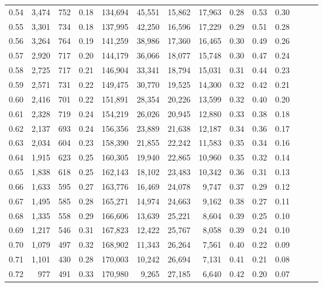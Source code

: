 \begin{tabular}{rrrrrrrrrrrrrr}
0.54 &  3,474 &  752 &  0.18 &  134,694 &   45,551 &  15,862 &  17,963 &  0.28 &  0.53 &      0.30 \\
0.55 &  3,301 &  734 &  0.18 &  137,995 &   42,250 &  16,596 &  17,229 &  0.29 &  0.51 &      0.28 \\
0.56 &  3,264 &  764 &  0.19 &  141,259 &   38,986 &  17,360 &  16,465 &  0.30 &  0.49 &      0.26 \\
0.57 &  2,920 &  717 &  0.20 &  144,179 &   36,066 &  18,077 &  15,748 &  0.30 &  0.47 &      0.24 \\
0.58 &  2,725 &  717 &  0.21 &  146,904 &   33,341 &  18,794 &  15,031 &  0.31 &  0.44 &      0.23 \\
0.59 &  2,571 &  731 &  0.22 &  149,475 &   30,770 &  19,525 &  14,300 &  0.32 &  0.42 &      0.21 \\
0.60 &  2,416 &  701 &  0.22 &  151,891 &   28,354 &  20,226 &  13,599 &  0.32 &  0.40 &      0.20 \\
0.61 &  2,328 &  719 &  0.24 &  154,219 &   26,026 &  20,945 &  12,880 &  0.33 &  0.38 &      0.18 \\
0.62 &  2,137 &  693 &  0.24 &  156,356 &   23,889 &  21,638 &  12,187 &  0.34 &  0.36 &      0.17 \\
0.63 &  2,034 &  604 &  0.23 &  158,390 &   21,855 &  22,242 &  11,583 &  0.35 &  0.34 &      0.16 \\
0.64 &  1,915 &  623 &  0.25 &  160,305 &   19,940 &  22,865 &  10,960 &  0.35 &  0.32 &      0.14 \\
0.65 &  1,838 &  618 &  0.25 &  162,143 &   18,102 &  23,483 &  10,342 &  0.36 &  0.31 &      0.13 \\
0.66 &  1,633 &  595 &  0.27 &  163,776 &   16,469 &  24,078 &   9,747 &  0.37 &  0.29 &      0.12 \\
0.67 &  1,495 &  585 &  0.28 &  165,271 &   14,974 &  24,663 &   9,162 &  0.38 &  0.27 &      0.11 \\
0.68 &  1,335 &  558 &  0.29 &  166,606 &   13,639 &  25,221 &   8,604 &  0.39 &  0.25 &      0.10 \\
0.69 &  1,217 &  546 &  0.31 &  167,823 &   12,422 &  25,767 &   8,058 &  0.39 &  0.24 &      0.10 \\
0.70 &  1,079 &  497 &  0.32 &  168,902 &   11,343 &  26,264 &   7,561 &  0.40 &  0.22 &      0.09 \\
0.71 &  1,101 &  430 &  0.28 &  170,003 &   10,242 &  26,694 &   7,131 &  0.41 &  0.21 &      0.08 \\
0.72 &    977 &  491 &  0.33 &  170,980 &    9,265 &  27,185 &   6,640 &  0.42 &  0.20 &      0.07 \\

\end{tabular}

